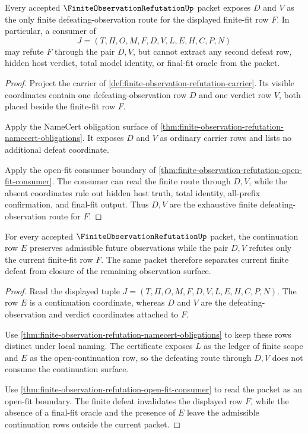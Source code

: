 \begin{theorem}
\label{thm:finite-observation-refutation-defeat-row-exposure}
Every accepted $\FiniteObservationRefutationUp$ packet exposes $D$ and $V$ as the only finite defeating-observation route for the displayed finite-fit row $F$. In particular, a consumer of
$$
J=(T,\Pi,O,M,F,D,V,L,E,H,C,P,N)
$$
may refute $F$ through the pair $D,V$, but cannot extract any second defeat row, hidden host verdict, total model identity, or final-fit oracle from the packet.
\end{theorem}
\begin{proof}
Project the carrier of \autoref{def:finite-observation-refutation-carrier}. Its visible coordinates contain one defeating-observation row $D$ and one verdict row $V$, both placed beside the finite-fit row $F$.

Apply the NameCert obligation surface of \autoref{thm:finite-observation-refutation-namecert-obligations}. It exposes $D$ and $V$ as ordinary carrier rows and lists no additional defeat coordinate.

Apply the open-fit consumer boundary of \autoref{thm:finite-observation-refutation-open-fit-consumer}. The consumer can read the finite route through $D,V$, while the absent coordinates rule out hidden host truth, total identity, all-prefix confirmation, and final-fit output. Thus $D,V$ are the exhaustive finite defeating-observation route for $F$.
\end{proof}

\begin{theorem}
\label{thm:finite-observation-refutation-open-continuation-separation}
For every accepted $\FiniteObservationRefutationUp$ packet, the continuation row $E$ preserves admissible future observations while the pair $D,V$ refutes only the current finite-fit row $F$. The same packet therefore separates current finite defeat from closure of the remaining observation surface.
\end{theorem}
\begin{proof}
Read the displayed tuple $J=(T,\Pi,O,M,F,D,V,L,E,H,C,P,N)$. The row $E$ is a continuation coordinate, whereas $D$ and $V$ are the defeating-observation and verdict coordinates attached to $F$.

Use \autoref{thm:finite-observation-refutation-namecert-obligations} to keep these rows distinct under local naming. The certificate exposes $L$ as the ledger of finite scope and $E$ as the open-continuation row, so the defeating route through $D,V$ does not consume the continuation surface.

Use \autoref{thm:finite-observation-refutation-open-fit-consumer} to read the packet as an open-fit boundary. The finite defeat invalidates the displayed row $F$, while the absence of a final-fit oracle and the presence of $E$ leave the admissible continuation rows outside the current packet.
\end{proof}

